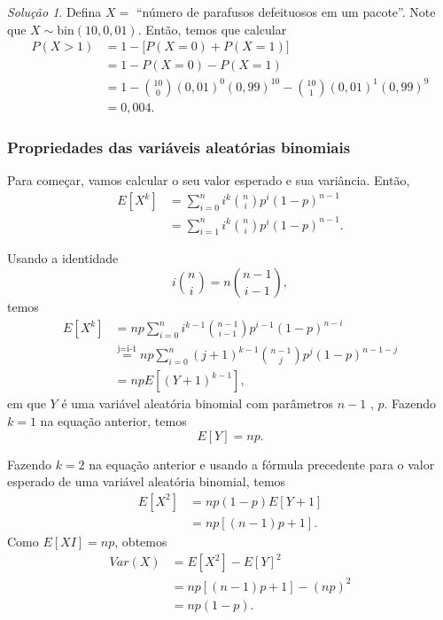 \documentclass[]{book}
\theoremstyle{definition}
\theoremstyle{definition}
\theoremstyle{definition}
\theoremstyle{remark}
\newtheorem*{solution}{Solução}
\begin{document}
\begin{solution}
\iffalse{} {Solução. } \fi{}Defina \(X=\) ``número de parafusos defeituosos em um pacote''.
Note que \(X \sim \mathrm{bin}(10, 0{,}01)\).
Então, temos que calcular
\begin{align}
P(X > 1) &= 1 - \big[P(X=0)+P(X=1)\big] \\
&= 1 - P(X=0)-P(X=1)\\
&= 1 - {10 \choose 0}(0{,}01)^0(0{,}99)^10-{10 \choose 1}(0{,}01)^1(0{,}99)^9\\
&= 0{,}004.
\end{align}
\end{solution}

\hypertarget{propriedades-das-variuxe1veis-aleatuxf3rias-binomiais}{%
\subsubsection*{Propriedades das variáveis aleatórias binomiais}\label{propriedades-das-variuxe1veis-aleatuxf3rias-binomiais}}

Para começar, vamos calcular o seu valor esperado e sua variância.
Então,
\begin{align*}
E[X^k] &= \sum_{i=0}^{n}i^k{n \choose i}p^i(1-p)^{n-1}\\
&=\sum_{i=1}^{n}i^k{n \choose i}p^i(1-p)^{n-1}.
\end{align*}

Usando a identidade \[i{n \choose i} = n{n-1 \choose i-1},\]
temos
\begin{align*}
E[X^k] &= np\sum_{i=0}^{n}i^{k-1}{n-1 \choose i-1}p^{i-1}(1-p)^{n-i}\\
&\stackrel{\text{j=i-1}}{=} np\sum_{i=0}^{n}(j+1)^{k-1}{n-1 \choose j}p^{j}(1-p)^{n-1-j}\\
&=npE[(Y+1)^{k-1}],
\end{align*}
em que \(Y\) é uma variável aleatória binomial com parâmetros \(n - 1\) , \(p\).
Fazendo \(k = 1\) na equação anterior, temos
\[E[Y] = np.\]

Fazendo \(k = 2\) na equação anterior e usando a fórmula precedente para o valor esperado de uma variável aleatória binomial, temos
\begin{align*}
 E[X^2] &= np(1-p)E[Y+1] \\
 &= np[(n-1)p+1].
\end{align*}
Como \(E[XI] = np\), obtemos
\begin{align*}
Var(X) &= E[X^2] - E[Y]^2\\
&= np[(n-1)p+1] - (np)^2\\
&= np(1-p).
\end{align*}
\end{document}
